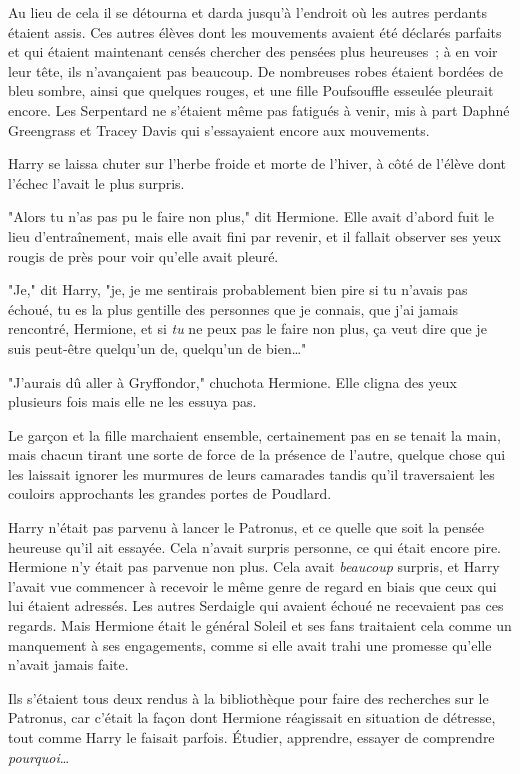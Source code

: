 Au lieu de cela il se détourna et darda jusqu'à l'endroit où les autres perdants étaient assis. Ces autres élèves dont les mouvements avaient été déclarés parfaits et qui étaient maintenant censés chercher des pensées plus heureuses~; à en voir leur tête, ils n'avançaient pas beaucoup. De nombreuses robes étaient bordées de bleu sombre, ainsi que quelques rouges, et une fille Poufsouffle esseulée pleurait encore. Les Serpentard ne s'étaient même pas fatigués à venir, mis à part Daphné Greengrass et Tracey Davis qui s'essayaient encore aux mouvements.

Harry se laissa chuter sur l'herbe froide et morte de l'hiver, à côté de l'élève dont l'échec l'avait le plus surpris.

"Alors tu n'as pas pu le faire non plus," dit Hermione. Elle avait d'abord fuit le lieu d'entraînement, mais elle avait fini par revenir, et il fallait observer ses yeux rougis de près pour voir qu'elle avait pleuré.

"Je," dit Harry, "je, je me sentirais probablement bien pire si tu n'avais pas échoué, tu es la plus gentille des personnes que je connais, que j'ai jamais rencontré, Hermione, et si \emph{tu} ne peux pas le faire non plus, ça veut dire que je suis peut-être quelqu'un de, quelqu'un de bien…"

"J'aurais dû aller à Gryffondor," chuchota Hermione. Elle cligna des yeux plusieurs fois mais elle ne les essuya pas.

\later

Le garçon et la fille marchaient ensemble, certainement pas en se tenait la main, mais chacun tirant une sorte de force de la présence de l'autre, quelque chose qui les laissait ignorer les murmures de leurs camarades tandis qu'il traversaient les couloirs approchants les grandes portes de Poudlard.

Harry n'était pas parvenu à lancer le Patronus, et ce quelle que soit la pensée heureuse qu'il ait essayée. Cela n'avait surpris personne, ce qui était encore pire. Hermione n'y était pas parvenue non plus. Cela avait \emph{beaucoup} surpris, et Harry l'avait vue commencer à recevoir le même genre de regard en biais que ceux qui lui étaient adressés. Les autres Serdaigle qui avaient échoué ne recevaient pas ces regards. Mais Hermione était le général Soleil et ses fans traitaient cela comme un manquement à ses engagements, comme si elle avait trahi une promesse qu'elle n'avait jamais faite.

Ils s'étaient tous deux rendus à la bibliothèque pour faire des recherches sur le Patronus, car c'était la façon dont Hermione réagissait en situation de détresse, tout comme Harry le faisait parfois. Étudier, apprendre, essayer de comprendre \emph{pourquoi}…

